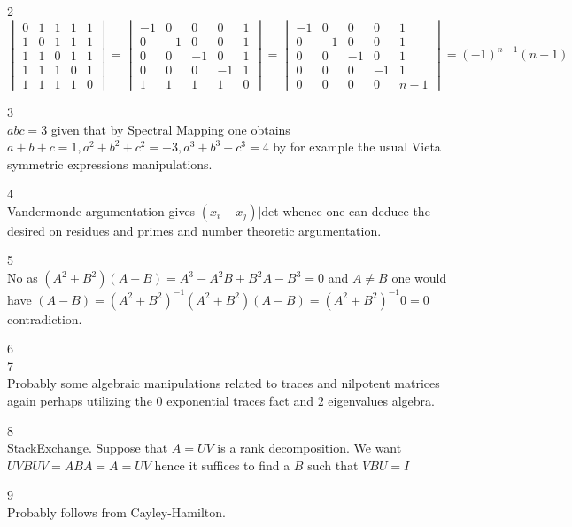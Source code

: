 2 \\
$
\begin{vmatrix}
0 & 1 & 1 & 1 & 1 \\
1 & 0 & 1 & 1 & 1 \\
1 & 1 & 0 & 1 & 1 \\
1 & 1 & 1 & 0 & 1 \\
1 & 1 & 1 & 1 & 0
\end{vmatrix}
=
\begin{vmatrix}
-1 & 0 & 0 & 0 & 1 \\
0 & -1 & 0 & 0 & 1 \\
0 & 0 & -1 & 0 & 1 \\
0 & 0 & 0 & -1 & 1 \\
1 & 1 & 1 & 1 & 0
\end{vmatrix}
=
\begin{vmatrix}
-1 & 0 & 0 & 0 & 1 \\
0 & -1 & 0 & 0 & 1 \\
0 & 0 & -1 & 0 & 1 \\
0 & 0 & 0 & -1 & 1 \\
0 & 0 & 0 & 0 & n-1
\end{vmatrix}
=
\boxed{(-1)^{n-1}(n-1)}
$

3 \\
$abc=\boxed{3}$ given that by Spectral Mapping one obtains $a+b+c=1, a^2+b^2+c^2=-3, a^3+b^3+c^3=4$ by for example the usual Vieta symmetric expressions manipulations.

4 \\
Vandermonde argumentation gives $(x_i-x_j)|\text{det}$ whence one can deduce the desired on residues and primes and number theoretic argumentation.

5 \\
No as $(A^2+B^2)(A-B)=A^3-A^2B+B^2A-B^3=0$ and $A \neq B$ one would have $(A-B)=(A^2+B^2)^{-1}(A^2+B^2)(A-B)=(A^2+B^2)^{-1}0=0$ contradiction.

6 \\


7 \\
Probably some algebraic manipulations related to traces and nilpotent matrices again perhaps utilizing the $0$ exponential traces fact and $2$ eigenvalues algebra.

8 \\
StackExchange. Suppose that $A=UV$ is a rank decomposition. We want $UVBUV=ABA=A=UV$ hence it suffices to find a $B$ such that $VBU=I$

9 \\
Probably follows from Cayley-Hamilton.

